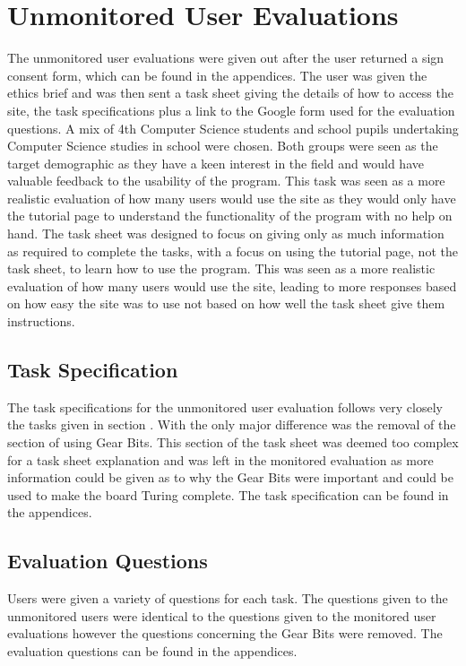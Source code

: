 \documentclass{l4proj}
\begin{document}
\section{Unmonitored User Evaluations}
The unmonitored user evaluations were given out after the user returned a sign consent form, which can be found in the appendices. The user was given the ethics brief and was then sent a task sheet giving the details of how to access the site, the task specifications plus a link to the Google form used for the evaluation questions. A mix of 4th Computer Science students and school pupils undertaking Computer Science studies in school were chosen. Both groups were seen as the target demographic as they have a keen interest in the field and would have valuable feedback to the usability of the program. This task was seen as a more realistic evaluation of how many users would use the site as they would only have the tutorial page to understand the functionality of the program with no help on hand. The task sheet was designed to focus on giving only as much information as required to complete the tasks, with a focus on using the tutorial page, not the task sheet, to learn how to use the program. This was seen as a more realistic evaluation of how many users would use the site, leading to more responses based on how easy the site was to use not based on how well the task sheet give them instructions.

\subsection{Task Specification}
The task specifications for the unmonitored user evaluation follows very closely the tasks given in section . With the only major difference was the removal of the section of using Gear Bits. This section of the task sheet was deemed too complex for a task sheet explanation and was left in the monitored evaluation as more information could be given as to why the Gear Bits were important and could be used to make the board Turing complete. The task specification can be found in the appendices.

\subsection{Evaluation Questions}
Users were given a variety of questions for each task. The questions given to the unmonitored users were identical to the questions given to the monitored user evaluations however the questions concerning the Gear Bits were removed. The evaluation questions can be found in the appendices. 
\end{document}

